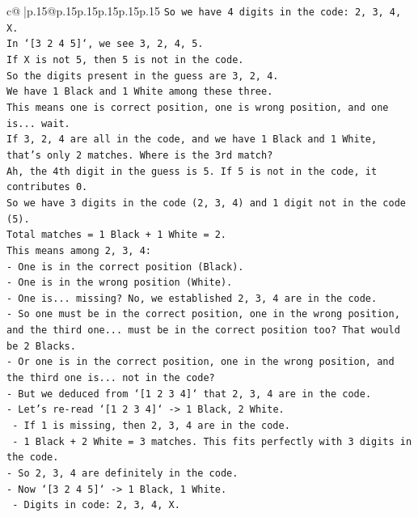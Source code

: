 \documentclass{article}
\begin{document}
{\begin{supertabular}{c@{$\;$}|p{.15\linewidth}@{}p{.15\linewidth}p{.15\linewidth}p{.15\linewidth}p{.15\linewidth}p{.15\linewidth}}
{{{\texttt{So we have 4 digits in the code: 2, 3, 4, X.} \\
\texttt{In `{[}3 2 4 5{]}`, we see 3, 2, 4, 5.} \\
\texttt{If X is not 5, then 5 is not in the code.} \\
\texttt{So the digits present in the guess are 3, 2, 4.} \\
\texttt{We have 1 Black and 1 White among these three.} \\
\texttt{This means one is correct position, one is wrong position, and one is... wait.} \\
\texttt{If 3, 2, 4 are all in the code, and we have 1 Black and 1 White, that's only 2 matches. Where is the 3rd match?} \\
\texttt{Ah, the 4th digit in the guess is 5. If 5 is not in the code, it contributes 0.} \\
\texttt{So we have 3 digits in the code (2, 3, 4) and 1 digit not in the code (5).} \\
\texttt{Total matches = 1 Black + 1 White = 2.} \\
\texttt{This means among 2, 3, 4:} \\
\texttt{{-} One is in the correct position (Black).} \\
\texttt{{-} One is in the wrong position (White).} \\
\texttt{{-} One is... missing? No, we established 2, 3, 4 are in the code.} \\
\texttt{{-} So one must be in the correct position, one in the wrong position, and the third one... must be in the correct position too? That would be 2 Blacks.} \\
\texttt{{-} Or one is in the correct position, one in the wrong position, and the third one is... not in the code?} \\
\texttt{{-} But we deduced from `{[}1 2 3 4{]}` that 2, 3, 4 are in the code.} \\
\texttt{{-} Let's re{-}read `{[}1 2 3 4{]}` {-}> 1 Black, 2 White.} \\
\texttt{  {-} If 1 is missing, then 2, 3, 4 are in the code.} \\
\texttt{  {-} 1 Black + 2 White = 3 matches. This fits perfectly with 3 digits in the code.} \\
\texttt{{-} So 2, 3, 4 are definitely in the code.} \\
\texttt{{-} Now `{[}3 2 4 5{]}` {-}> 1 Black, 1 White.} \\
\texttt{  {-} Digits in code: 2, 3, 4, X.} \\
}}}
\end{supertabular}}
\end{document}

